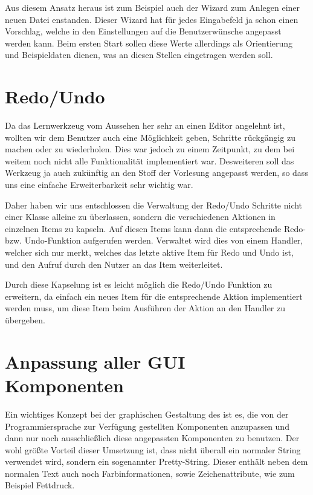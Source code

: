 Aus diesem Ansatz heraus ist zum Beispiel auch der Wizard zum Anlegen einer
neuen Datei enstanden. Dieser Wizard hat für jedes Eingabefeld ja schon einen
Vorschlag, welche in den Einstellungen auf die Benutzerwünsche angepasst werden
kann. Beim ersten Start sollen diese Werte allerdings als Orientierung und
Beispieldaten dienen, was an diesen Stellen eingetragen werden soll.
\vspace{10pt}


\section{Redo/Undo}\label{GUIRedoUndo}

Da das Lernwerkzeug vom Aussehen her sehr an einen Editor angelehnt ist,
wollten wir dem Benutzer auch eine Möglichkeit geben, Schritte rückgängig zu
machen oder zu wiederholen. Dies war jedoch zu einem Zeitpunkt, zu dem bei
weitem noch nicht alle Funktionalität implementiert war. Desweiteren soll das
Werkzeug ja auch zukünftig an den Stoff der Vorlesung angepasst werden, so dass
uns eine einfache Erweiterbarkeit sehr wichtig war.\vspace{10pt}

Daher haben wir uns entschlossen die Verwaltung der Redo/Undo Schritte nicht
einer Klasse alleine zu überlassen, sondern die verschiedenen Aktionen in
einzelnen Items zu kapseln. Auf diesen Items kann dann die entsprechende Redo-
bzw. Undo-Funktion aufgerufen werden. Verwaltet wird dies von einem Handler,
welcher sich nur merkt, welches das letzte aktive Item für Redo und Undo ist,
und den Aufruf durch den Nutzer an das Item weiterleitet.\vspace{10pt}

Durch diese Kapselung ist es leicht möglich die Redo/Undo Funktion zu
erweitern, da einfach ein neues Item für die entsprechende Aktion implementiert
werden muss, um diese Item beim Ausführen der Aktion an den Handler zu
übergeben.\vspace{10pt}


\section{Anpassung aller GUI Komponenten}\label{GUIAdaption}

Ein wichtiges Konzept bei der graphischen Gestaltung des \gtitool ist es, die von
der Programmiersprache zur Verfügung gestellten Komponenten anzupassen und dann
nur noch ausschließlich diese angepassten Komponenten zu benutzen. Der wohl
größte Vorteil dieser Umsetzung ist, dass nicht überall ein normaler String
verwendet wird, sondern ein sogenannter Pretty-String. Dieser enthält neben dem
normalen Text auch noch Farbinformationen, sowie Zeichenattribute, wie zum
Beispiel Fettdruck.\vspace{10pt}

